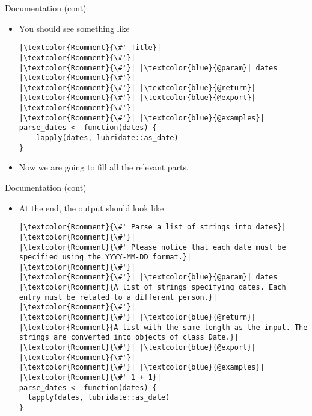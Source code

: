 \documentclass[
hyperref={bookmarks=false},
xcolor={dvipsnames,svgnames*,x11names*}, 
12pt
]{beamer}
\begin{document}
\begin{frame}[fragile]{Documentation (cont)}
\vspace{-0.5cm}
\begin{itemize}
\itemsep 2ex
\item You should see something like
\begin{lstlisting}
|\textcolor{Rcomment}{\#' Title}|
|\textcolor{Rcomment}{\#'}|
|\textcolor{Rcomment}{\#'}| |\textcolor{blue}{@param}| dates 
|\textcolor{Rcomment}{\#'}|
|\textcolor{Rcomment}{\#'}| |\textcolor{blue}{@return}|
|\textcolor{Rcomment}{\#'}| |\textcolor{blue}{@export}|
|\textcolor{Rcomment}{\#'}|
|\textcolor{Rcomment}{\#'}| |\textcolor{blue}{@examples}|
parse_dates <- function(dates) {
	lapply(dates, lubridate::as_date)
}
\end{lstlisting}
\item Now we are going to fill all the relevant parts. 
\end{itemize}
\end{frame}

\begin{frame}[fragile]{Documentation (cont)}
\vspace{-0.5cm}
\begin{itemize}
\itemsep 2ex
\item At the end, the output should look like
\begin{lstlisting}
|\textcolor{Rcomment}{\#' Parse a list of strings into dates}|
|\textcolor{Rcomment}{\#'}|
|\textcolor{Rcomment}{\#' Please notice that each date must be specified using the YYYY-MM-DD format.}|
|\textcolor{Rcomment}{\#'}|
|\textcolor{Rcomment}{\#'}| |\textcolor{blue}{@param}| dates |\textcolor{Rcomment}{A list of strings specifying dates. Each entry must be related to a different person.}|
|\textcolor{Rcomment}{\#'}|
|\textcolor{Rcomment}{\#'}| |\textcolor{blue}{@return}| |\textcolor{Rcomment}{A list with the same length as the input. The strings are converted into objects of class Date.}|
|\textcolor{Rcomment}{\#'}| |\textcolor{blue}{@export}|
|\textcolor{Rcomment}{\#'}|
|\textcolor{Rcomment}{\#'}| |\textcolor{blue}{@examples}|
|\textcolor{Rcomment}{\#' 1 + 1}|
parse_dates <- function(dates) {
  lapply(dates, lubridate::as_date)
}
\end{lstlisting}
\end{itemize}
\end{frame}
\end{document}
